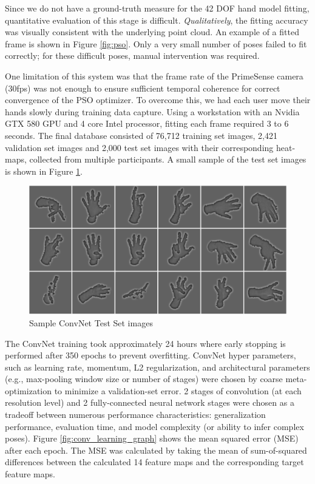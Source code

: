 Since we do not have a ground-truth measure for the 42 DOF hand model fitting, quantitative evaluation of this stage is difficult. \emph{Qualitatively}, the fitting accuracy was visually consistent with the underlying point cloud. An example of a fitted frame is shown in Figure \ref{fig:pso}. Only a very small number of poses failed to fit correctly; for these difficult poses, manual intervention was required.

One limitation of this system was that the frame rate of the PrimeSense camera (30fps) was not enough to ensure sufficient temporal coherence for correct convergence of the PSO optimizer. To overcome this, we had each user move their hands slowly during training data capture. Using a workstation with an Nvidia GTX 580 GPU and 4 core Intel processor, fitting each frame required 3 to 6 seconds. The final database consisted of 76,712 training set images, 2,421 validation set images and 2,000 test set images with their corresponding heat-maps, collected from multiple participants. A small sample of the test set images is shown in Figure \ref{fig:cnn_training_set_images}.

\begin{figure}[ht]
\centering
\includegraphics[width=0.8\columnwidth]{figures_1_hand_tracking/train_data_3_6}
    \caption{Sample ConvNet Test Set images}
    \label{fig:cnn_training_set_images}
\end{figure}

The ConvNet training took approximately 24 hours where early stopping is performed after 350 epochs to prevent overfitting. ConvNet hyper parameters, such as learning rate, momentum, L2 regularization, and architectural parameters (e.g., max-pooling window size or number of stages) were chosen by coarse meta-optimization to minimize a validation-set error. 2 stages of convolution (at each resolution level) and 2 fully-connected neural network stages were chosen as a tradeoff between numerous performance characteristics: generalization performance, evaluation time, and model complexity (or ability to infer complex poses). Figure \ref{fig:conv_learning_graph} shows the mean squared error (MSE) after each epoch. The MSE was calculated by taking the mean of sum-of-squared differences between the calculated 14 feature maps and the corresponding target feature maps.

